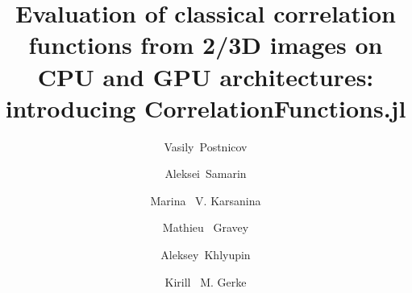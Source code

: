 \documentclass[1p]{elsarticle}
\begin{document}
\author[Smith]{Vasily~Postnicov}
\author[Smith,MIT]{Aleksei~Samarin}
\author[Smith]{Marina ~V. Karsanina}
\author[Aus]{Mathieu ~Gravey}
\author[MIPT]{Aleksey~Khlyupin}
\author[Smith]{Kirill ~M. Gerke}

\address[Smith]{Schmidt Institute of Physics of the Earth of Russian Academy of
  Sciences, Moscow, 107031, Russia}
\address[MIT]{Computational Mathematics and Cybernetics, Lomonosov Moscow State
  University, Moscow, 119991, Russia}
\address[Aus]{Institute for Interdisciplinary Mountain Research, Austrian
  Academy of Sciences, Innsbruck, 6020, Austria}
\address[MIPT]{Moscow Institute of Physics and Technology, Institutskiy Pereulok 9,
Dolgoprudny, Moscow, Russia 141700}

\title{Evaluation of classical correlation functions from 2/3D images on CPU and
  GPU architectures: introducing CorrelationFunctions.jl}
\end{document}

